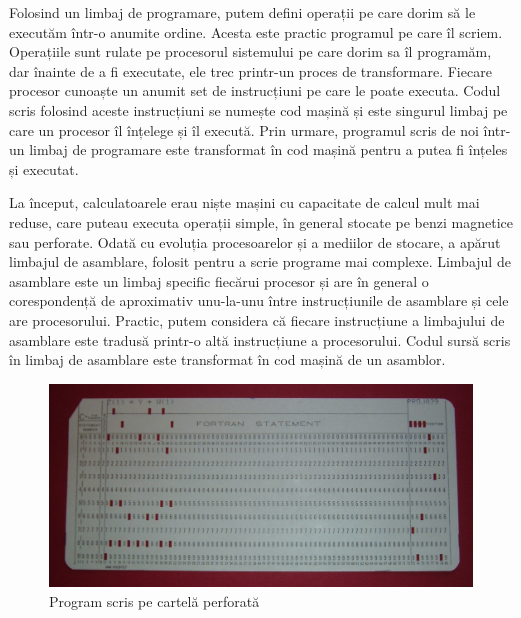 Folosind un limbaj de programare, putem defini operații pe care dorim să le
executăm într-o anumite ordine. Acesta este practic programul pe care îl scriem.
Operațiile sunt rulate pe procesorul sistemului pe care dorim sa îl programăm,
dar înainte de a fi executate, ele trec printr-un proces de transformare.
Fiecare procesor cunoaște un anumit set de instrucțiuni pe care le poate
executa. Codul scris folosind aceste instrucțiuni se numește cod mașină și este
singurul limbaj pe care un procesor îl înțelege și îl execută. Prin urmare,
programul scris de noi într-un limbaj de programare este transformat în cod
mașină pentru a putea fi înțeles și executat.

La început, calculatoarele erau niște mașini cu capacitate de calcul mult mai
reduse, care puteau executa operații simple, în general stocate pe benzi
magnetice sau perforate. Odată cu evoluția procesoarelor și a mediilor de
stocare, a apărut limbajul de asamblare, folosit pentru a scrie programe mai
complexe. Limbajul de asamblare este un limbaj specific fiecărui procesor și are
în general o corespondență de aproximativ unu-la-unu între instrucțiunile de
asamblare și cele are procesorului. Practic, putem considera că fiecare
instrucțiune a limbajului de asamblare este tradusă printr-o altă instrucțiune a
procesorului. Codul sursă scris în limbaj de asamblare este transformat în cod
mașină de un asamblor.

\begin{figure}[!htbp]
	\centering
	\includegraphics[width=15cm]{chapters/06-appdev/img/fortran-card-img.png}
	\caption{Program scris pe cartelă perforată\protect\footnotemark}
	\label{fig:appdev-fortran}
\end{figure}


